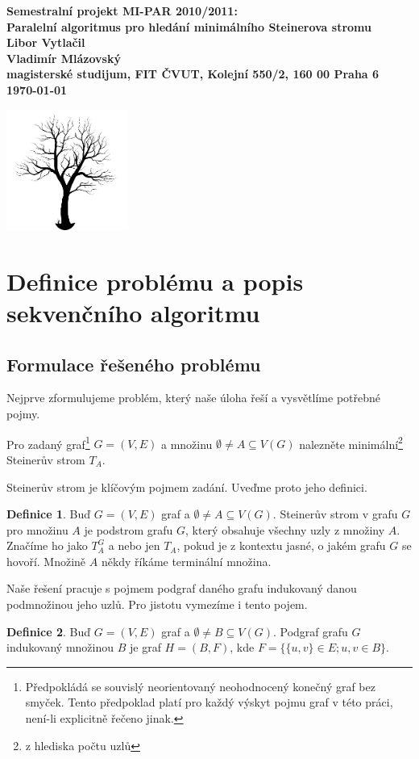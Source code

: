\documentclass[12pt]{article}
\theoremstyle{definition}
\newtheorem{definice}{Definice}
\begin{document}

\begin{center}
\bf Semestralní projekt MI-PAR 2010/2011:\\[5mm]
    Paralelní algoritmus pro hledání minimálního Steinerova stromu	\\[5mm]
       Libor Vytlačil\\
       Vladimír Mlázovský\\[2mm]
magisterské studijum, FIT ČVUT, Kolejní 550/2, 160 00 Praha 6\\[2mm]
\today

\vspace{2cm}
\includegraphics[width=0.3\textwidth]{obr/tree.png}
\end{center}
\newpage
\tableofcontents
\newpage
\section{Definice problému a popis sekvenčního algoritmu}
\subsection{Formulace řešeného problému}
Nejprve zformulujeme problém, který naše úloha řeší a vysvětlíme potřebné pojmy.

Pro zadaný graf\footnote{Předpokládá se souvislý neorientovaný neohodnocený konečný graf bez smyček. Tento předpoklad platí pro každý výskyt pojmu graf v této práci, není-li explicitně řečeno jinak.} $G=(V,E)$
a množinu $\emptyset\neq A\subseteq V(G)$ nalezněte minimální\footnote{z hlediska počtu uzlů} Steinerův strom $T_A$.

Steinerův strom je klíčovým pojmem zadání. Uveďme proto jeho definici.
\begin{definice}
	Buď $G=(V,E)$ graf a $\emptyset\neq A\subseteq V(G)$. Steinerův strom v grafu $G$ pro množinu $A$ je podstrom grafu $G$, který obsahuje všechny uzly z množiny $A$. Značíme ho jako $T_A^G$ a nebo jen $T_A$, pokud je z kontextu jasné, o jakém grafu $G$ se hovoří. Množině $A$ někdy říkáme terminální množina.
\end{definice}
Naše řešení pracuje s pojmem podgraf daného grafu indukovaný danou podmnožinou jeho uzlů. Pro jistotu vymezíme i tento pojem.
\begin{definice}
	Buď $G=(V,E)$ graf a $\emptyset\neq B\subseteq V(G)$. Podgraf grafu $G$ indukovaný množinou $B$ je graf $H=(B,F)$, kde
	$F=\{\{u,v\}\in E;u,v\in B \}.$
\end{definice}
\end{document}
